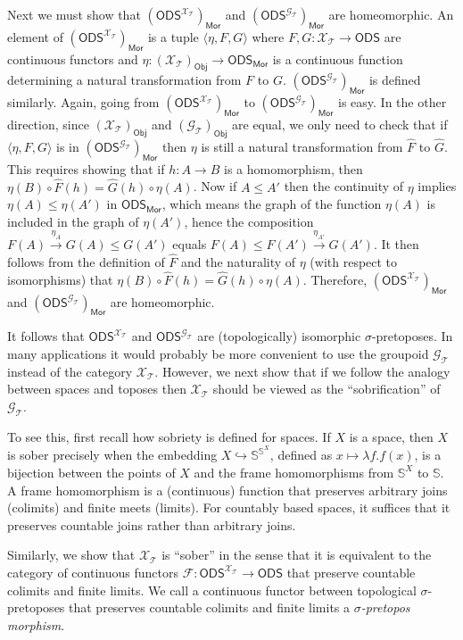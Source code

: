 \documentclass{article}
\theoremstyle{plain}
\def\cal#1{{\mathcal #1}}
\def\sierp{{\mathbb S}}
\def\calF{{\cal F}}
\def\calG{{\cal G}}
\def\calT{{\cal T}}
\def\calX{{\cal X}}
\newcommand{\ODS}{{\mathsf{ODS}}}
\newcommand{\Mor}{\mathsf{Mor}}
\newcommand{\Obj}{\mathsf{Obj}}
\begin{document}
Next we must show that $(\ODS^{\calX_\calT})_\Mor$ and $(\ODS^{\calG_\calT})_\Mor$ are homeomorphic. An element of $(\ODS^{\calX_\calT})_\Mor$ is a tuple $\langle \eta, F, G\rangle$ where $F,G\colon \calX_\calT \to \ODS$ are continuous functors and $\eta\colon (\calX_\calT)_\Obj \to \ODS_\Mor$ is a continuous function determining a natural transformation from $F$ to $G$. $(\ODS^{\calG_\calT})_\Mor$ is defined similarly. Again, going from $(\ODS^{\calX_\calT})_\Mor$ to $(\ODS^{\calG_\calT})_\Mor$ is easy. In the other direction, since $(\calX_\calT)_\Obj$ and $(\calG_\calT)_\Obj$ are equal, we only need to check that if $\langle \eta, F, G\rangle$ is in $(\ODS^{\calG_\calT})_\Mor$ then $\eta$ is still a natural transformation from $\hat{F}$ to $\hat{G}$. This requires showing that if $h\colon A\to B$ is a homomorphism, then $\eta(B) \circ \hat{F}(h) = \hat{G}(h) \circ \eta(A)$. Now if $A \leq A'$ then the continuity of $\eta$ implies $\eta(A) \leq \eta(A')$ in $\ODS_\Mor$, which means the graph of the function $\eta(A)$ is included in the graph of $\eta(A')$, hence the composition $F(A) \stackrel{\eta_{A}}{\to} G(A)\leq G(A')$ equals $F(A) \leq F(A') \stackrel{\eta_{A'}}{\to} G(A')$. It then follows from the definition of $\hat{F}$ and the naturality of $\eta$ (with respect to isomorphisms) that $\eta(B) \circ \hat{F}(h) = \hat{G}(h) \circ \eta(A)$. Therefore, $(\ODS^{\calX_\calT})_\Mor$ and $(\ODS^{\calG_\calT})_\Mor$ are homeomorphic.

It follows that $\ODS^{\calX_\calT}$ and $\ODS^{\calG_\calT}$ are (topologically) isomorphic $\sigma$-pretoposes. In many applications it would probably be more convenient to use the groupoid $\calG_\calT$ instead of the category $\calX_\calT$. However, we next show that if we follow the analogy between spaces and toposes then $\calX_\calT$ should be viewed as the ``sobrification'' of $\calG_\calT$. 

To see this, first recall how sobriety is defined for spaces. If $X$ is a space, then $X$ is sober precisely when the embedding $X \hookrightarrow \sierp^{\sierp^X}$, defined as $x \mapsto \lambda f.f(x)$, is a bijection between the points of $X$ and the frame homomorphisms from $\sierp^X$ to $\sierp$. A frame homomorphism is a (continuous) function that preserves arbitrary joins (colimits) and finite meets (limits). For countably based spaces, it suffices that it preserves countable joins rather than arbitrary joins.

Similarly, we show that $\calX_\calT$ is ``sober'' in the sense that it is equivalent to the category of continuous functors $\calF\colon \ODS^{\calX_\calT} \to \ODS$ that preserve countable colimits and finite limits. We call a continuous functor between topological $\sigma$-pretoposes that preserves countable colimits and finite limits a \emph{$\sigma$-pretopos morphism}.
\end{document}
